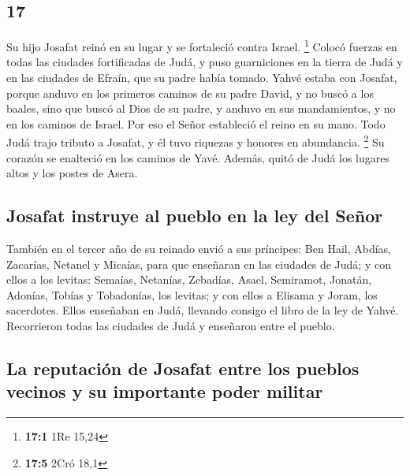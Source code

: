 \begin{paracol}{2}
\hypertarget{section-32}{%
\section{17}\label{section-32}}

 Su hijo Josafat reinó en su lugar y se fortaleció contra
Israel. \footnote{\textbf{17:1} 1Re 15,24}  Colocó fuerzas
en todas las ciudades fortificadas de Judá, y puso guarniciones en la
tierra de Judá y en las ciudades de Efraín, que su padre había tomado.
 Yahvé estaba con Josafat, porque anduvo en los primeros
caminos de su padre David, y no buscó a los baales,  sino
que buscó al Dios de su padre, y anduvo en sus mandamientos, y no en los
caminos de Israel.  Por eso el Señor estableció el reino
en su mano. Todo Judá trajo tributo a Josafat, y él tuvo riquezas y
honores en abundancia. \footnote{\textbf{17:5} 2Cró 18,1} 
Su corazón se enalteció en los caminos de Yavé. Además, quitó de Judá
los lugares altos y los postes de Asera.

\hypertarget{josafat-instruye-al-pueblo-en-la-ley-del-seuxf1or}{%
\subsection{Josafat instruye al pueblo en la ley del
Señor}\label{josafat-instruye-al-pueblo-en-la-ley-del-seuxf1or}}

 También en el tercer año de su reinado envió a sus
príncipes: Ben Hail, Abdías, Zacarías, Netanel y Micaías, para que
enseñaran en las ciudades de Judá;  y con ellos a los
levitas: Semaías, Netanías, Zebadías, Asael, Semiramot, Jonatán,
Adonías, Tobías y Tobadonías, los levitas; y con ellos a Elisama y
Joram, los sacerdotes.  Ellos enseñaban en Judá, llevando
consigo el libro de la ley de Yahvé. Recorrieron todas las ciudades de
Judá y enseñaron entre el pueblo.

\hypertarget{la-reputaciuxf3n-de-josafat-entre-los-pueblos-vecinos-y-su-importante-poder-militar}{%
\subsection{La reputación de Josafat entre los pueblos vecinos y su
importante poder
militar}\label{la-reputaciuxf3n-de-josafat-entre-los-pueblos-vecinos-y-su-importante-poder-militar}}


\end{paracol}
